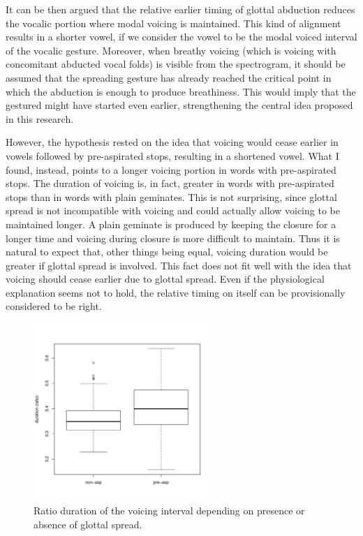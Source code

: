 \documentclass[11pt,a4paper,openany]{memoir}\usepackage[]{graphicx}\usepackage[]{color}
\newenvironment{knitrout}{}{} %
\begin{document}
It can be then argued that the relative earlier timing of glottal abduction reduces the vocalic portion where modal voicing is maintained.
This kind of alignment results in a shorter vowel, if we consider the vowel to be the modal voiced interval of the vocalic gesture.
Moreover, when breathy voicing (which is voicing with concomitant abducted vocal folds) is visible from the spectrogram, it should be assumed that the spreading gesture has already reached the critical point in which the abduction is enough to produce breathiness.
This would imply that the gestured might have started even earlier, strengthening the central idea proposed in this research.

However, the hypothesis rested on the idea that voicing would cease earlier in vowels followed by pre-aspirated stops, resulting in a shortened vowel.
What I found, instead, points to a longer voicing portion in words with pre-aspirated stops.
The duration of voicing is, in fact, greater in words with pre-aspirated stops than in words with plain geminates.
This is not surprising, since glottal spread is not incompatible with voicing and could actually allow voicing to be maintained longer.
A plain geminate is produced by keeping the closure for a longer time and voicing during closure is more difficult to maintain.
Thus it is natural to expect that, other things being equal, voicing duration would be greater if glottal spread is involved.
This fact does not fit well with the idea that voicing should cease earlier due to glottal spread.
Even if the physiological explanation seems not to hold, the relative timing on itself can be provisionally considered to be right.

\begin{figure}
\centering
\begin{knitrout}
\color{fgcolor}
\includegraphics[width=0.6\textwidth]{img/voic-stop-1} 

\end{knitrout}
\caption{Ratio duration of the voicing interval depending on presence or absence of glottal spread.}
\label{f:voicdur}
\end{figure}
\end{document}
